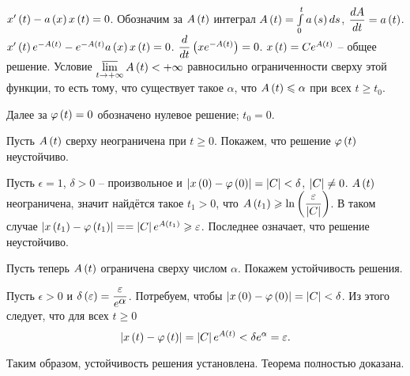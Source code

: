 \documentclass[a5paper,10pt]{article}
\begin{document}
$x'\left(t\right) - a\left(x\right) x\left(t\right) = 0$. Обозначим за $A\left(t\right)$ интеграл $A\left(t\right) = \int\limits_{0}^{t} a\left(s\right) ds$, $\dfrac {dA} {dt} = a\left(t\right)$.
$x'\left(t\right) e^{- A\left(t\right)} - e^{- A\left(t\right)} a\left(x\right) x\left(t\right) = 0$.
$\dfrac {d} {dt} \left( x e^{- A\left(t\right)}\right) = 0$. $x\left(t\right) = C e^{A\left(t\right)}$ -- общее решение. 
Условие $\operatorname*{\overline{\lim}}\limits_{t \to +\infty} A\left(t\right) < +\infty$ равносильно ограниченности сверху этой функции, то есть тому, что существует такое $\alpha$, что $A\left(t\right) \leqslant \alpha$ при всех $t \ge t_{0}$.

Далее за $\varphi\left(t\right) = 0$ обозначено нулевое решение; $t_{0} = 0$.

\begin{necessity}

Пусть $A\left(t\right)$ сверху неограничена при $t \ge 0$. Покажем, что решение $\varphi\left(t\right)$ неустойчиво.

Пусть $\epsilon = 1$, $\delta > 0$ -- произвольное и $\left|x\left(0\right) - \varphi\left(0\right)\right| = \left|C\right| < \delta$, $\left|C\right| \ne 0$. $A\left(t\right)$ неограничена, значит найдётся такое $t_{1} > 0$, что $A\left(t_{1}\right) \geqslant \ln\left(\dfrac {\varepsilon} {\left|C\right|}\right)$. В таком случае $\vbr{x\br{t_{1}} - \phi\br{t_{1}}} = \linebreak = \vbr{C} e^{A\br{t_{1}}} \ge \epsilon$.
Последнее означает, что решение неустойчиво.

\end{necessity}

\begin{sufficiency}

Пусть теперь $A\left(t\right)$ ограничена сверху числом $\alpha$. Покажем устойчивость решения.

Пусть $\epsilon > 0$ и $\delta\br{\epsilon} = \dfrac {\epsilon} {\tpow{e}{\alpha}}$. Потребуем, чтобы $\left|x\left(0\right) - \varphi\left(0\right)\right| = \left|C\right| < \delta$. Из этого следует, что для всех $t \ge 0$
$$\left|x\left(t\right) - \varphi\left(t\right)\right| = \left|C\right| e^{A\left(t\right)} < \delta e^{\alpha} = \varepsilon.$$

Таким образом, устойчивость решения установлена. Теорема полностью доказана.

\end{sufficiency}
\end{document}
